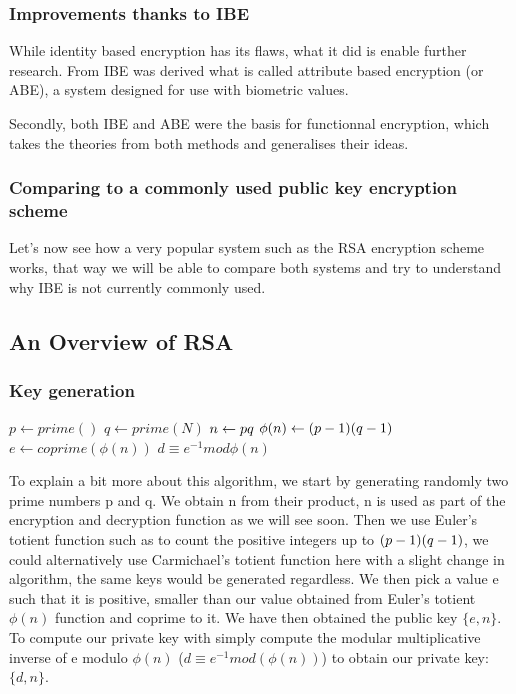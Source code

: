 \documentclass[conference]{IEEEtran}
\begin{document}
\subsubsection{Improvements thanks to IBE}
While identity based encryption has its flaws, what it did 
is enable further research. From IBE was derived what is called
attribute based encryption (or ABE), a system designed 
for use with biometric values.


Secondly, both IBE and ABE were the basis for functionnal encryption, 
which takes the theories from both methods and generalises their ideas.


\subsubsection{Comparing to a commonly used public key encryption scheme}
Let's now see how a very popular system such as the RSA encryption scheme works, 
that way we will be able to compare both systems and try to understand why 
IBE is not currently commonly used.


\subsection{An Overview of RSA}
\subsubsection{Key generation}

\begin{algorithmic}
\STATE $p \leftarrow prime()$
\STATE $q \leftarrow prime(N)$
\STATE $n \leftarrow p \* q$
\STATE $\phi (n) \leftarrow (p - 1) \* (q - 1)$
\STATE $e \leftarrow coprime(\phi (n))$
\STATE $d \equiv e^{-1} mod \phi(n)$
\end{algorithmic}
To explain a bit more about this algorithm, we start by generating randomly two prime numbers
p and q. We obtain n from their product, n is used as part of the encryption and decryption function
as we will see soon. Then we use Euler's totient function such as to count the positive integers
up to $(p - 1) \* (q - 1)$, we could alternatively use Carmichael's totient function here 
with a slight change in algorithm, the same keys would be generated regardless. We then pick a value e
such that it is positive, smaller than our value obtained from Euler's totient $\phi(n) $ function and coprime to it.
We have then obtained the public key $\{e,n\}$. To compute our private key with simply compute 
the modular multiplicative inverse of e modulo $\phi(n)$ ($d \equiv e^{-1} mod(\phi(n))$) to obtain
our private key: $\{d,n\}$.
\end{document}
